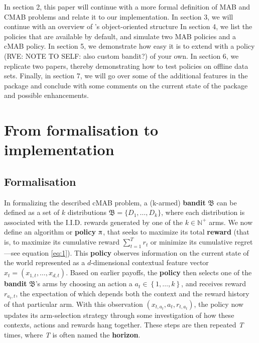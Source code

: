 \documentclass[nojss]{jss}\usepackage[]{graphicx}\usepackage[]{color}
\begin{document}
In section 2, this paper will continue with a more formal definition of MAB and CMAB problems and relate it to our implementation. In section 3, we will continue with an overview of ’s object-oriented structure In section 4, we list the policies that are available by default, and simulate two MAB policies and a cMAB policy. In section 5, we demonstrate how easy it is to extend  with a policy (RVE: NOTE TO SELF: also custom bandit?) of your own. In section 6, we replicate two papers, thereby demonstrating how to test policies on offline data sets. Finally, in section  7, we will go over some of the additional features in the package and conclude with some comments on the current state of the package and possible enhancements.


\section{From formalisation to implementation}


\subsection{Formalisation}


In formalizing the described cMAB problem, a (k-armed) \textbf{bandit} $\mathfrak{B}$ can be defined as a set of $k$ distributions $\mathfrak{B}=\{D_{1},\dots ,D_{k}\}$, where each distribution is associated with the I.I.D. rewards generated by one of the $k\in \mathbb {N} ^{+}$ arms. We now define an algorithm or \textbf{policy} $\piup$, that seeks to maximize its total \textbf{reward} (that is, to maximize its cumulative reward $\sum_{t=1}^T r_t$ or minimize its cumulative regret---see equation \ref{eq:1}). This \textbf{policy} observes information on the current state of the world represented as a $d$-dimensional contextual feature vector \(x_{t}=\left( x_{1,t},  \dots, x_{d,t}\right)\). Based on earlier payoffs, the \textbf{policy} then selects one of the \textbf{bandit} $\mathfrak{B}$'s arms by choosing an action a \(a_{t} \in \left\{ 1, \dots, k \right\}\), and receives reward \(r_{a_{t},t}\), the expectation of which depends both the context and the reward history of that particular arm. With this observation \( (x_{t,a_t},a_{t},r_{t,a_t}) \), the policy now updates its arm-selection strategy through some investigation of how these contexts, actions and rewards hang together. These steps are then repeated \textit{T} times, where \textit{T} is often named the \textbf{horizon}.
\end{document}
